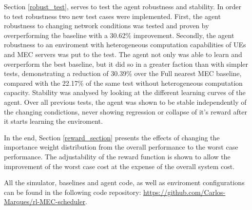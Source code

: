 Section \ref{robust_test}, serves to test the agent robustness and stability. In order to test robustness two new test cases were implemented. First, the agent robustness to changing network conditions was tested and proven by overperforming the baseline with a 30.62\% improvement. Secondly, the agent robustness to an enviroment with heterogeneous computation capabilities of \acrshort{UE}s and \acrshort{MEC} servers was put to the test. The agent not only was able to learn and overperform the best baseline, but it did so in a greater faction than with simpler tests, demonstrating a reduction of 30.39\% over the Full nearest MEC baseline, compared with the 22.17\% of the same test without heterogeneous computation capacity. Stability was analysed by looking at the different learning curves of the agent. Over all previous tests, the agent was shown to be stable independently of the changing condictions, never showing regression or collapse of it's reward after it starts learning the enviroment.

In the end, Section \ref{reward_section} presents the effects of changing the importance weight distribution from the overall performance to the worst case performance. The adjustability of the reward function is shown to allow the improvement of the worst case cost at the expense of the overall system cost.

All the simulator, baselines and agent code, as well as enviroment configurations can be found in the following code repository:
\href{https://github.com/Carlos-Marques/rl-MEC-scheduler}{https://github.com/Carlos-Marques/rl-MEC-scheduler}.

\clearpage
